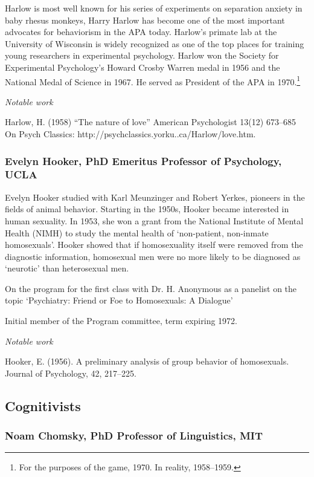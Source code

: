 \begin{refsection}
Harlow is most well known for his series of experiments on separation anxiety in baby rhesus monkeys, Harry Harlow has become one of the most important advocates for behaviorism in the APA today. Harlow's primate lab at the University of Wisconsin is widely recognized as one of the top places for training young researchers in experimental psychology. Harlow won the Society for Experimental Psychology's Howard Crosby Warren medal in 1956 and the National Medal of Science in 1967. He served as President of the APA in 1970.\footnote{For the purposes of the game, 1970. In reality, 1958--1959.} 

\emph{Notable work}

Harlow, H. (1958) ``The nature of love'' American Psychologist 13(12) 673--685 On Psych Classics: http:\slash \slash psychclassics.yorku..ca\slash Harlow\slash love.htm.

\subsubsection{Evelyn Hooker, PhD Emeritus Professor of Psychology, UCLA}
\label{evelynhookerphdemeritusprofessorofpsychologyucla}

Evelyn Hooker studied with Karl Meunzinger and Robert Yerkes, pioneers in the fields of animal behavior. Starting in the 1950s, Hooker became interested in human sexuality. In 1953, she won a grant from the National Institute of Mental Health (NIMH) to study the mental health of `non-patient, non-inmate homosexuals'. Hooker showed that if homosexuality itself were removed from the diagnostic information, homosexual men were no more likely to be diagnosed as `neurotic' than heterosexual men.

On the program for the first class with Dr. H. Anonymous as a panelist on the topic `Psychiatry: Friend or Foe to Homosexuals: A Dialogue'

Initial member of the Program committee, term expiring 1972.

\emph{Notable work}

Hooker, E. (1956). A preliminary analysis of group behavior of homosexuals. Journal of Psychology, 42, 217--225.

\subsection{Cognitivists}
\label{cognitivists}

\subsubsection{Noam Chomsky, PhD Professor of Linguistics, MIT}
\label{noamchomskyphdprofessoroflinguisticsmit}


\end{refsection}
